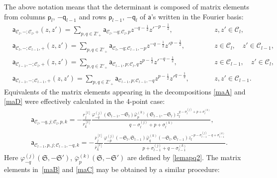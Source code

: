 \documentclass[pdftex]{sigma}
\numberwithin{equation}{section}
\begin{document}
The above notation means that the determinant is composed of matrix elements from columns $\boldsymbol{\mathsf p}_{l}$, $-\boldsymbol{\mathsf q}_{l-1}$ and rows $\boldsymbol{\mathsf p}_{l-1}$, $-\boldsymbol{\mathsf q}_{l}$ of $\mathsf a$'s written in the Fourier basis:
\begin{subequations}
\begin{alignat}{3}
\label{maA}
& \mathsf a_{\mathcal C_{l},-;\mathcal C_{l},+}(z,z')=\sum_{p,q\in\mathbb Z'_+}
\mathsf a_{\mathcal C_{l},-q;\mathcal C_{l},p}z^{-q-\frac12}z'^{-p-\frac12},\qquad && z,z'\in\mathcal C_l,&\\
\label{maB} &\mathsf a_{\mathcal C_{l},-;\mathcal C_{l-1},+}(z,z')=\sum_{p,q\in\mathbb Z'_+}
\mathsf a_{\mathcal C_{l},-q;\mathcal C_{l-1},-p}z^{-q-\frac12}z'^{p-\frac12},\qquad && z\in\mathcal C_{l},\quad z'\in\mathcal C_{l-1},&\\
\label{maC}&\mathsf a_{\mathcal C_{l-1},-;\mathcal C_{l},+}(z,z')=\sum_{p,q\in\mathbb Z'_+}
\mathsf a_{\mathcal C_{l-1},p;\mathcal C_{l},q}z^{p-\frac12}z'^{-q-\frac12},\qquad &&z\in\mathcal C_{l-1},\quad z'\in\mathcal C_l, &\\
\label{maD}&\mathsf a_{\mathcal C_{l-1},-;\mathcal C_{l-1},+}(z,z')=\sum_{p,q\in\mathbb Z'_+}
\mathsf a_{\mathcal C_{l-1},p;\mathcal C_{l-1},-q}z^{p-\frac12}z'^{q-\frac12},\qquad &&z,z'\in\mathcal C_{l-1}.&
\end{alignat}
\end{subequations}
Equivalents of the matrix elements appearing in the decompositions \eqref{maA} and \eqref{maD} were effectively calculated in the 4-point case:
\begin{gather}
\mathsf a_{\mathcal C_{l},-q,j;\mathcal C_{l},p,k}= -\frac{r^{[l]}_j}{r^{[l]}_k}\frac{\varphi_{-q}^{(j)}(\mathfrak S_{l-1},-\mathfrak S_l)
\bar\varphi_{p}^{(k)}(\mathfrak S_{l-1},-\mathfrak S_l) z_l^{q-\sigma_l^{(j)}+p+\sigma_l^{(k)}}}{q-\sigma_l^{(j)}+p+\sigma_l^{(k)}},\nonumber\\
\mathsf a_{\mathcal C_{l-1},p,j;\mathcal C_{l-1},-q,k}= -\frac{\bar r^{[l]}_j}{\bar r^{[l]}_k}
\frac{\varphi_{-p}^{(j)}(-\mathfrak S_l,\mathfrak S_{l-1}) \bar\varphi_{q}^{(k)}(-\mathfrak S_l,\mathfrak S_{l-1})
z_l^{-p-\sigma_{l-1}^{(j)}-q+\sigma_{l-1}^{(k)}}}{p+\sigma_{l-1}^{(j)}+q-\sigma_{l-1}^{(k)}} .\label{cael1}
\end{gather}
Here $\varphi_{-q}^{(j)}(\mathfrak S,-\mathfrak S')$, $\bar\varphi_{p}^{(k)}(\mathfrak S,-\mathfrak S')$ are defined by \eqref{lemapq2}. The matrix elements in~\eqref{maB} and \eqref{maC} may be obtained by a similar procedure:
\end{document}
